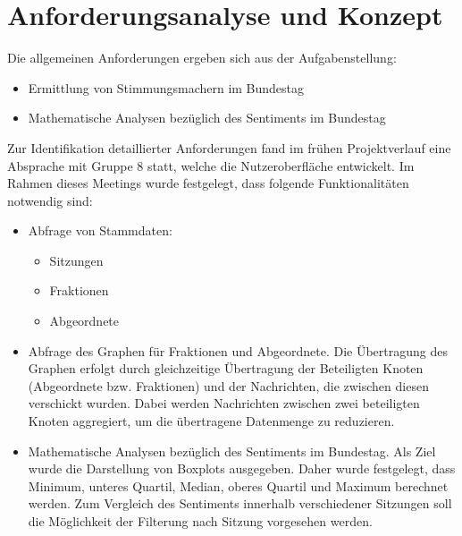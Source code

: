 \section{Anforderungsanalyse und Konzept}\label{sec:07_03_anforderungen_konzept}

Die allgemeinen Anforderungen ergeben sich aus der Aufgabenstellung:
\begin{itemize}
	\item Ermittlung von Stimmungsmachern im Bundestag
	\item Mathematische Analysen bezüglich des Sentiments im Bundestag
\end{itemize}
Zur Identifikation detaillierter Anforderungen fand im frühen Projektverlauf eine Absprache mit Gruppe 8 statt, welche die Nutzeroberfläche entwickelt.
Im Rahmen dieses Meetings wurde festgelegt, dass folgende Funktionalitäten notwendig sind:
\begin{itemize}
	\item Abfrage von Stammdaten:
	\begin{itemize}
		\item Sitzungen
		\item Fraktionen
		\item Abgeordnete
	\end{itemize}
	\item Abfrage des Graphen für Fraktionen und Abgeordnete. Die Übertragung des Graphen erfolgt durch gleichzeitige Übertragung der Beteiligten Knoten (Abgeordnete bzw. Fraktionen) und der Nachrichten, die zwischen diesen verschickt wurden. Dabei werden Nachrichten zwischen zwei beteiligten Knoten aggregiert, um die übertragene Datenmenge zu reduzieren.
	\item Mathematische Analysen bezüglich des Sentiments im Bundestag. Als Ziel wurde die Darstellung von Boxplots ausgegeben. Daher wurde festgelegt, dass Minimum, unteres Quartil, Median, oberes Quartil und Maximum berechnet werden. Zum Vergleich des Sentiments innerhalb verschiedener Sitzungen soll die Möglichkeit der Filterung nach Sitzung vorgesehen werden.
\end{itemize}

\newpage
